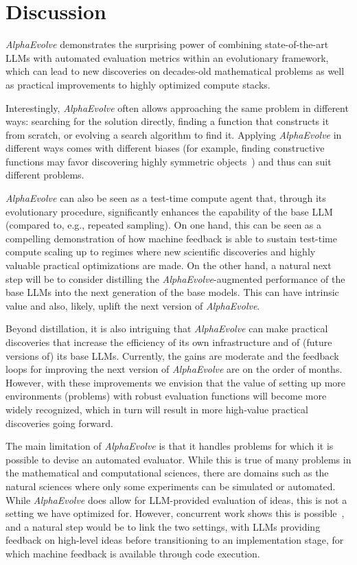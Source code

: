 \documentclass[logo,copyright,12pt]{googledeepmind}
\theoremstyle{definition}
\theoremstyle{remark}
\theoremstyle{plain}
\newcommand{\method}{\emph{AlphaEvolve}\xspace}
\begin{document}



\section{Discussion}
\label{sec:discussion}

\method demonstrates the surprising power of combining state-of-the-art LLMs with automated evaluation metrics within an evolutionary framework, which can lead to new discoveries on decades-old mathematical problems as well as practical improvements to highly optimized compute stacks.

Interestingly, \method often allows approaching the same problem in different ways: searching for the solution directly, finding a function that constructs it from scratch, or evolving a search algorithm to find it.
Applying \method in different ways  comes with different biases (for example, finding constructive functions may favor discovering highly symmetric objects~\cite{paredes2023mathematical}) and thus can suit different problems.

\method can also be seen as a test-time compute agent that, through its evolutionary procedure, significantly enhances the capability of the base LLM (compared to, e.g., repeated sampling).
On one hand, this can be seen as a compelling demonstration of how machine feedback is able to sustain test-time compute scaling up to regimes where new scientific discoveries and highly valuable practical optimizations are made.
On the other hand, a natural next step will be to consider distilling the \method-augmented performance of the base LLMs into the next generation of the base models.
This can have intrinsic value and also, likely, uplift the next version of \method.

Beyond distillation, it is also intriguing that \method can make practical discoveries that increase the efficiency of its own infrastructure and of (future versions of) its base LLMs.
Currently, the gains are moderate and the feedback loops for improving the next version of \method are on the order of months.
However, with these improvements we envision that the value of setting up more environments (problems) with robust evaluation functions will become more widely recognized, which in turn will result in more high-value practical discoveries going forward.

The main limitation of \method is that it handles problems for which it is possible to devise an automated evaluator.
While this is true of many problems in the mathematical and computational sciences, there are domains such as the natural sciences where only some experiments can be simulated or automated.
While \method does allow for LLM-provided evaluation of ideas, this is not a setting we have optimized for.
However, concurrent work shows this is possible~\cite{gottweis2025towards}, and a natural step would be to link the two settings, with LLMs providing feedback on high-level ideas before transitioning to an implementation stage, for which machine feedback is available through code execution.
\end{document}
